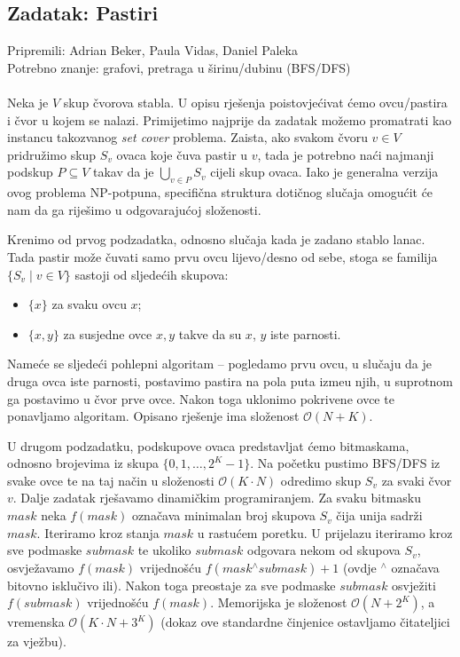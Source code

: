 \subsection*{Zadatak: Pastiri}
\textsf{Pripremili: Adrian Beker, Paula Vidas, Daniel Paleka}\\
\textsf{Potrebno znanje: grafovi, pretraga u širinu/dubinu (BFS/DFS)}
\\\\
Neka je $V$ skup čvorova stabla. U opisu rješenja poistovjećivat ćemo ovcu/pastira i čvor u kojem se nalazi. Primijetimo najprije da zadatak možemo promatrati kao instancu takozvanog \emph{set cover} problema. Zaista, ako svakom čvoru $v \in V$ pridružimo skup $S_v$ ovaca koje čuva pastir u $v$, tada je potrebno naći najmanji podskup $P \subseteq V$ takav da je $\bigcup_{v \in P} S_v$ cijeli skup ovaca. Iako je generalna verzija ovog problema NP-potpuna, specifična struktura dotičnog slučaja omogućit će nam da ga riješimo u odgovarajućoj složenosti.

Krenimo od prvog podzadatka, odnosno slučaja kada je zadano stablo lanac. Tada pastir može čuvati samo prvu ovcu lijevo/desno od sebe, stoga se familija $\{S_v \mid v \in V\}$ sastoji od sljedećih skupova:
\begin{itemize}
    \item $\{x\}$ za svaku ovcu $x$;
    \item $\{x, y\}$ za susjedne ovce $x, y$ takve da su $x$, $y$ iste parnosti.
\end{itemize}
Nameće se sljedeći pohlepni algoritam -- pogledamo prvu ovcu, u slučaju da je druga ovca iste parnosti, postavimo pastira na pola puta izme\dj u njih, u suprotnom ga postavimo u čvor prve ovce. Nakon toga uklonimo pokrivene ovce te ponavljamo algoritam. Opisano rješenje ima složenost $\mathcal{O}(N + K)$.

U drugom podzadatku, podskupove ovaca predstavljat ćemo bitmaskama, odnosno brojevima iz skupa $\{0, 1, \ldots, 2^K-1\}$. Na početku pustimo BFS/DFS iz svake ovce te na taj način u složenosti $\mathcal{O}(K \cdot N)$ odredimo skup $S_v$ za svaki čvor $v$. Dalje zadatak rješavamo dinamičkim programiranjem. Za svaku bitmasku $mask$ neka $f(mask)$ označava minimalan broj skupova $S_v$ čija unija sadrži $mask$. Iteriramo kroz stanja $mask$ u rastućem poretku. U prijelazu iteriramo kroz sve podmaske $submask$ te ukoliko $submask$ odgovara nekom od skupova $S_v$, osvježavamo $f(mask)$ vrijednošću $f(mask \mathbin{^\wedge} submask) + 1$ (ovdje $^\wedge$ označava bitovno isklučivo ili). Nakon toga preostaje za sve podmaske $submask$ osvježiti $f(submask)$ vrijednošću $f(mask)$. Memorijska je složenost $\mathcal{O}(N + 2^K)$, a vremenska $\mathcal{O}(K \cdot N + 3^K)$ (dokaz ove standardne činjenice ostavljamo čitateljici za vježbu).

